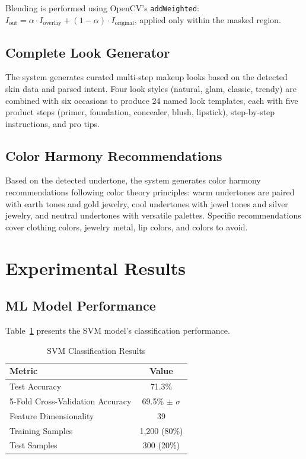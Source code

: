 \documentclass[conference]{IEEEtran}
\begin{document}
Blending is performed using OpenCV's \texttt{addWeighted}: $I_{\text{out}} = \alpha \cdot I_{\text{overlay}} + (1-\alpha) \cdot I_{\text{original}}$, applied only within the masked region.

\subsection{Complete Look Generator}

The system generates curated multi-step makeup looks based on the detected skin data and parsed intent. Four look styles (natural, glam, classic, trendy) are combined with six occasions to produce 24 named look templates, each with five product steps (primer, foundation, concealer, blush, lipstick), step-by-step instructions, and pro tips.

\subsection{Color Harmony Recommendations}

Based on the detected undertone, the system generates color harmony recommendations following color theory principles: warm undertones are paired with earth tones and gold jewelry, cool undertones with jewel tones and silver jewelry, and neutral undertones with versatile palettes. Specific recommendations cover clothing colors, jewelry metal, lip colors, and colors to avoid.

\section{Experimental Results}

\subsection{ML Model Performance}

Table~\ref{tab:ml_results} presents the SVM model's classification performance.

\begin{table}[t]
\centering
\caption{SVM Classification Results}
\label{tab:ml_results}
\begin{tabular}{lc}
\toprule
\textbf{Metric} & \textbf{Value} \\
\midrule
Test Accuracy & 71.3\% \\
5-Fold Cross-Validation Accuracy & 69.5\% $\pm$ $\sigma$ \\
Feature Dimensionality & 39 \\
Training Samples & 1,200 (80\%) \\
Test Samples & 300 (20\%) \\
\bottomrule
\end{tabular}
\end{table}
\end{document}
